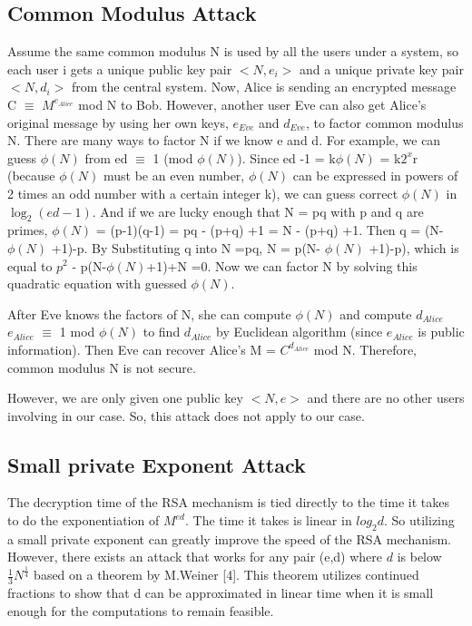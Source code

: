 \documentclass[12pt]{article} %
\begin{document}
	\subsection{ Common Modulus Attack}
	Assume the same common modulus N is used by all the users under a system, so each user i gets a unique public key pair $<N,e_i>$ and a unique private key pair $<N,d_i>$ from the central system.
	Now, Alice is sending an encrypted message C $\equiv$ $M^{e_{Alice}}$ mod N to Bob. 
	However, another user Eve can also get Alice's original message by using her own keys, ${e_{Eve}}$ and ${d_{Eve}}$, to factor common modulus N. There are many ways to factor N if we know e and d.
	For example, we can guess $\phi(N)$  from ed $\equiv$ 1 (mod $\phi(N)$). Since ed -1 = k$\phi(N)$ = k$2^x$r (because $\phi(N)$ must be an even number, $\phi(N)$ can be expressed in powers of 2 times an odd number with a certain integer k),
	we can guess correct $\phi(N)$ in $\log_2(ed-1)$.
	And if we are lucky enough that N = pq with p and q are primes, $\phi(N)$ = (p-1)(q-1) = pq - (p+q) +1 = N - (p+q) +1. Then q = (N- $\phi(N)$ +1)-p. By Substituting q into N =pq, N = p(N- $\phi(N)$ +1)-p), which is equal to $p^2$ - p(N-$\phi(N)$+1)+N =0.
	Now we can factor N by solving this quadratic equation with guessed $\phi(N)$.
	
	After Eve knows the factors of N, she can compute $\phi(N)$ and compute ${d_{Alice}}$ ${e_{Alice}}$ $\equiv$ 1 mod $\phi(N)$ to find ${d_{Alice}}$ by Euclidean algorithm (since ${e_{Alice}}$ is public information).
	Then Eve can recover Alice's M = $C^{d_{Alice}}$ mod N.
	Therefore, common modulus N is not secure.
	
	However, we are only given one public key $<N,e>$ and there are no other users involving in our case. So, this attack does not apply to our case. 
	
	\subsection{Small private Exponent Attack}
	The decryption time of the RSA mechanism is tied directly to the time it takes to do the exponentiation of $ M^{ed} $. The time it takes is linear in $log_{2}d $. So utilizing a small private exponent can greatly improve the speed of the RSA mechanism. However, there exists an attack that
	works for any pair (e,d) where $d$ is below $ \frac{1}{3}N^{\frac{1}{4}} $ based on a theorem by M.Weiner [4].
	This theorem utilizes continued fractions to show that d can be approximated in linear time when it is small enough for the computations to remain feasible. 
	
\end{document}
